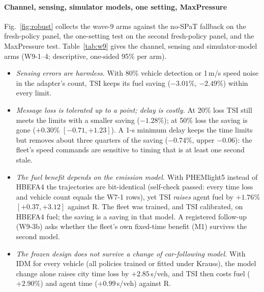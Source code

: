 \paragraph{Channel, sensing, simulator models, one setting, MaxPressure} Fig.~\ref{fig:robust} collects the wave-9 arms against the no-SPaT
fallback on the fresh-policy panel, the one-setting test on the second fresh-policy panel, and the MaxPressure test.
Table~\ref{tab:w9} gives the channel, sensing and simulator-model arms (W9-1--4; descriptive, one-sided 95\% per arm).
\begin{itemize}\setlength\itemsep{1pt}
\item \emph{Sensing errors are harmless.} With 80\% vehicle detection or 1\,m/s speed noise in the adapter's count, TSI keeps its fuel
saving ($-3.01\%$, $-2.49\%$) within every limit.
\item \emph{Message loss is tolerated up to a point; delay is costly.} At 20\% loss TSI still meets the limits with a smaller saving
($-1.28\%$); at 50\% loss the saving is gone ($+0.30\%$ $[-0.71,+1.23]$). A 1-s minimum delay keeps the time limits but removes about
three quarters of the saving ($-0.74\%$, upper $-0.06$): the fleet's speed commands are sensitive to timing that is at least one second
stale.
\item \emph{The fuel benefit depends on the emission model.} With PHEMlight5 instead of HBEFA4 the trajectories are bit-identical (self-check
passed: every time loss and vehicle count equals the W7-1 rows), yet TSI \emph{raises} agent fuel by $+1.76\%$ $[+0.37,+3.12]$ against R.
The fleet was trained, and TSI calibrated, on HBEFA4 fuel; the saving is a saving in that model. A registered follow-up (W9-3b) asks
whether the fleet's own fixed-time benefit (M1) survives the second model.
\item \emph{The frozen design does not survive a change of car-following model.} With IDM for every vehicle (all policies trained or fitted
under Krauss), the model change alone raises city time loss by $+2.85$\,s/veh, and TSI then costs fuel ($+2.90\%$) and agent time
($+0.99$\,s/veh) against R.
\end{itemize}
